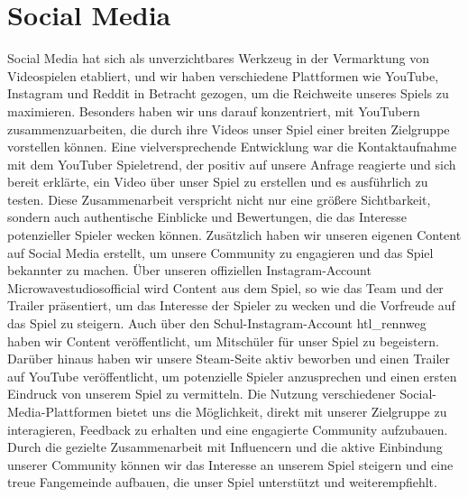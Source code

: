 
\section{Social Media}\label{sec:social-media}

\renewcommand{\kapitelautor}{Autor: Nils Hubmann} %


%
Social Media hat sich als unverzichtbares Werkzeug in der Vermarktung von Videospielen etabliert, und wir haben verschiedene Plattformen wie YouTube, Instagram und Reddit in Betracht gezogen, um die Reichweite unseres Spiels zu maximieren.
Besonders haben wir uns darauf konzentriert, mit YouTubern zusammenzuarbeiten, die durch ihre Videos unser Spiel einer breiten Zielgruppe vorstellen können.
Eine vielversprechende Entwicklung war die Kontaktaufnahme mit dem YouTuber Spieletrend, der positiv auf unsere Anfrage reagierte und sich bereit erklärte,
ein Video über unser Spiel zu erstellen und es ausführlich zu testen. Diese Zusammenarbeit verspricht nicht nur eine größere Sichtbarkeit, sondern auch authentische Einblicke und Bewertungen,
die das Interesse potenzieller Spieler wecken können. Zusätzlich haben wir unseren eigenen Content auf Social Media erstellt, um unsere Community zu engagieren und das Spiel bekannter zu machen.
Über unseren offiziellen Instagram-Account Microwavestudiosofficial wird Content aus dem Spiel, so wie das Team und der Trailer präsentiert, um das Interesse der Spieler zu wecken und die Vorfreude auf das Spiel zu steigern.
Auch über den Schul-Instagram-Account htl\_rennweg haben wir Content veröffentlicht, um Mitschüler für unser Spiel zu begeistern.
Darüber hinaus haben wir unsere Steam-Seite aktiv beworben und einen Trailer auf YouTube veröffentlicht, um potenzielle Spieler anzusprechen und einen ersten Eindruck von unserem Spiel zu vermitteln.
Die Nutzung verschiedener Social-Media-Plattformen bietet uns die Möglichkeit, direkt mit unserer Zielgruppe zu interagieren, Feedback zu erhalten und eine engagierte Community aufzubauen.
Durch die gezielte Zusammenarbeit mit Influencern und die aktive Einbindung unserer Community können wir das Interesse an unserem Spiel steigern und eine treue Fangemeinde aufbauen, die unser Spiel unterstützt und weiterempfiehlt.
%

\renewcommand{\kapitelautor}{}
